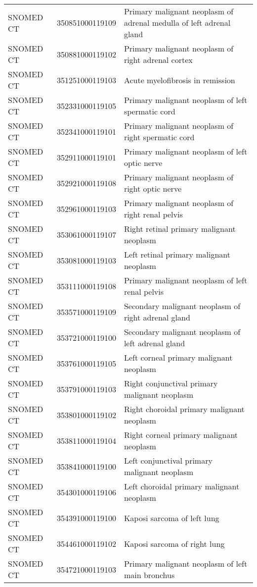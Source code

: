 \begin{longtable}{p{}p{}p{}}
  SNOMED CT & 350851000119109 & Primary malignant neoplasm of adrenal medulla of left adrenal gland \\ 
  SNOMED CT & 350881000119102 & Primary malignant neoplasm of right adrenal cortex \\ 
  SNOMED CT & 351251000119103 & Acute myelofibrosis in remission \\ 
  SNOMED CT & 352331000119105 & Primary malignant neoplasm of left spermatic cord \\ 
  SNOMED CT & 352341000119101 & Primary malignant neoplasm of right spermatic cord \\ 
  SNOMED CT & 352911000119101 & Primary malignant neoplasm of left optic nerve \\ 
  SNOMED CT & 352921000119108 & Primary malignant neoplasm of right optic nerve \\ 
  SNOMED CT & 352961000119103 & Primary malignant neoplasm of right renal pelvis \\ 
  SNOMED CT & 353061000119107 & Right retinal primary malignant neoplasm \\ 
  SNOMED CT & 353081000119103 & Left retinal primary malignant neoplasm \\ 
  SNOMED CT & 353111000119108 & Primary malignant neoplasm of left renal pelvis \\ 
  SNOMED CT & 353571000119109 & Secondary malignant neoplasm of right adrenal gland \\ 
  SNOMED CT & 353721000119100 & Secondary malignant neoplasm of left adrenal gland \\ 
  SNOMED CT & 353761000119105 & Left corneal primary malignant neoplasm \\ 
  SNOMED CT & 353791000119103 & Right conjunctival primary malignant neoplasm \\ 
  SNOMED CT & 353801000119102 & Right choroidal primary malignant neoplasm \\ 
  SNOMED CT & 353811000119104 & Right corneal primary malignant neoplasm \\ 
  SNOMED CT & 353841000119100 & Left conjunctival primary malignant neoplasm \\ 
  SNOMED CT & 354301000119106 & Left choroidal primary malignant neoplasm \\ 
  SNOMED CT & 354391000119100 & Kaposi sarcoma of left lung \\ 
  SNOMED CT & 354461000119102 & Kaposi sarcoma of right lung \\ 
  SNOMED CT & 354721000119103 & Primary malignant neoplasm of left main bronchus \\ 

\end{longtable}
